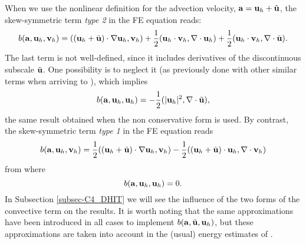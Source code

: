 \begin{remark}
\label{rem-skewsym}
When we use the nonlinear definition for the advection velocity, ${\bf a}={\bf u}_h+\tilde{{\bf u}}$, the skew-symmetric term \textit{type 2}  in the FE equation  reads: 
\begin{equation}
\label{eq-C2_b_skew2_aux1}
b({\bf a},{\bf u}_h,{\bf v}_h)=(({\bf u}_h+\tilde{{\bf u}})\cdot\nabla{\bf u}_h,{\bf v}_h)+\frac{1}{2}({\bf u}_h\cdot{\bf v}_h,\nabla\cdot{\bf u}_h)+\frac{1}{2}({\bf u}_h\cdot{\bf v}_h,\nabla\cdot\tilde{{\bf u}}).
\end{equation}
The last term is not well-defined, since it includes derivatives of the discontinuous subscale $\tilde{{\bf u}}$. One possibility is to neglect it (as previously done with other similar terms when arriving to ), which implies
\begin{equation}
b({\bf a},{\bf u}_h,{\bf u}_h)=-\frac{1}{2}(|{\bf u}_h|^2,\nabla\cdot\tilde{{\bf u}}),
\end{equation}
the same result obtained when the non conservative form is used.
By contrast, the skew-symmetric term \textit{type 1} in the FE equation  reads
\begin{equation}
\label{eq-C2_b_skew1_aux1}
b({\bf a},{\bf u}_h,{\bf v}_h)=\frac{1}{2}(({\bf u}_h+\tilde{{\bf u}})\cdot\nabla{\bf u}_h,{\bf v}_h)-\frac{1}{2}(({\bf u}_h+\tilde{{\bf u}})\cdot{\bf u}_h,\nabla\cdot{\bf v}_h)
\end{equation}
from where
\begin{equation}
b({\bf a},{\bf u}_h,{\bf u}_h)=0.
\end{equation}
In Subsection \ref{subsec-C4_DHIT} we will see the influence of the two forms of the convective term on the results.
It is worth noting that the same approximations have been introduced in all cases to implement $b({\bf a},\tilde{{\bf u}},{\bf u}_h)$, but these approximations are taken into account in the (usual) energy estimates of .
\end{remark}

